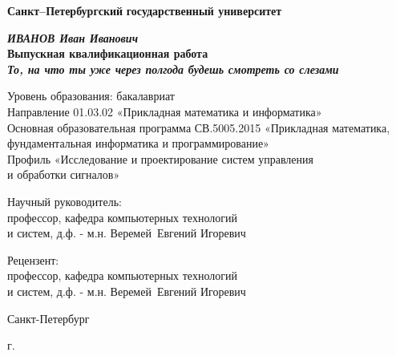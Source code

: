 
\begin{titlepage}
\begin{center}

\textbf{Санкт--Петербургский}
\textbf{государственный университет}

\vspace{35mm}

\textbf{\textit{\large ИВАНОВ Иван Иванович}} \\[8mm]
\textbf{\large Выпускная квалификационная работа}\\[3mm]
\textbf{\textit{\large То, на что ты уже через полгода будешь смотреть со слезами}}

\vspace{20mm}
Уровень образования: бакалавриат\\
Направление 01.03.02 «Прикладная математика и информатика»\\
Основная образовательная программа СВ.5005.2015
«Прикладная математика, фундаментальная информатика и программирование»\\
Профиль «Исследование и проектирование систем управления\\ и обработки сигналов»\\[25mm]


\begin{flushright}
\begin{minipage}[t]{0.65\textwidth}
{Научный руководитель:} \\
профессор, кафедра компьютерных технологий \\ и систем, д.ф. - м.н. Веремей~Евгений Игоревич

\vspace{10mm}

{Рецензент:} \\
профессор, кафедра компьютерных технологий \\и систем, д.ф. - м.н. Веремей~Евгений Игоревич
\end{minipage}
\end{flushright}

\vfill 

{Санкт-Петербург}
\par{\the\year{} г.}
\end{center}
\end{titlepage}
\restoregeometry
\addtocounter{page}{1}